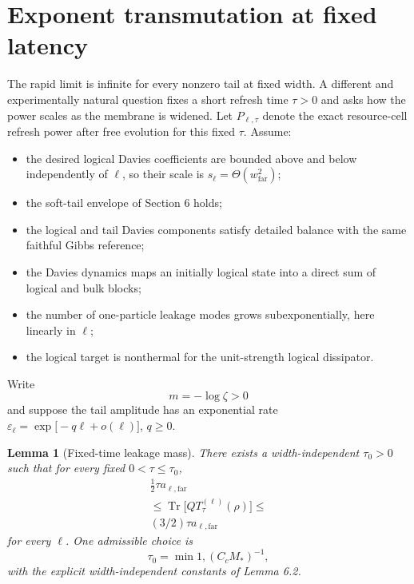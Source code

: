 \documentclass[11pt,a4paper]{article}
\newtheorem{lemma}[theorem]{Lemma}
\theoremstyle{remark}
\begin{document}
\section{Exponent transmutation at fixed latency}
The rapid limit is infinite for every nonzero tail at fixed width. A different and experimentally natural question fixes a short refresh time $\tau>0$ and asks how the power scales as the membrane is widened.
Let $P_{\ell,\tau}$ denote the exact resource-cell refresh power after free evolution for this fixed $\tau$. Assume:
\begin{itemize}
\item the desired logical Davies coefficients are bounded above and below independently of $\ell$, so their scale is $s_\ell=\Theta(w_{\mathrm{far}}^{2})$;
\item the soft-tail envelope of Section 6 holds;
\item the logical and tail Davies components satisfy detailed balance with the same faithful Gibbs reference;
\item the Davies dynamics maps an initially logical state into a direct sum of logical and bulk blocks;
\item the number of one-particle leakage modes grows subexponentially, here linearly in $\ell$;
\item the logical target is nonthermal for the unit-strength logical dissipator.
\end{itemize}
Write
\[
m=-\log \zeta>0
\]
and suppose the tail amplitude has an exponential rate
$\varepsilon_\ell=\exp\bigl[-q \ell+o(\ell)\bigr]$,  $q\ge 0$.
\begin{lemma}[Fixed-time leakage mass]
There exists a width-independent $\tau_0>0$ such that for every fixed $0<\tau\le \tau_0$,
\[
\begin{gathered}
\frac{1}{2}\tau a_{\ell,\mathrm{far}} \\
\le \operatorname{Tr}\bigl[Q T_\tau^{(\ell)}(\rho)\bigr]\le  \\
(3/2)\tau a_{\ell,\mathrm{far}}
\end{gathered}
\]
for every $\ell$. One admissible choice is
\[
\tau_0=\min{1,(C_c M_*)^{-1}}\mathpunct{,}
\]
with the explicit width-independent constants of Lemma 6.2.
\end{lemma}
\end{document}
